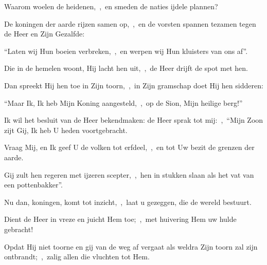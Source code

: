\documentclass[12pt,twoside,a5paper]{article}
\begin{document}
\begin{halfparskip}
  Waarom woelen de heidenen,~\sep\ en smeden de naties ijdele plannen?


  De koningen der aarde rijzen samen op,~\sep\ en de vorsten spannen tezamen tegen de Heer en Zijn Gezalfde:

  ``Laten wij Hun boeien verbreken,~\sep\ en werpen wij Hun kluisters van ons af''.
\end{halfparskip}


\begin{halfparskip}
  Die in de hemelen woont, Hij lacht hen uit,~\sep\ de Heer drijft de spot met hen.

  Dan spreekt Hij hen toe in Zijn toorn,~\sep\ in Zijn gramschap doet Hij hen sidderen:

  ``Maar Ik, Ik heb Mijn Koning aangesteld,~\sep\ op de Sion, Mijn heilige berg!''
\end{halfparskip}


\begin{halfparskip}
  Ik wil het besluit van de Heer bekendmaken: de Heer sprak tot mij:~\sep\ ``Mijn Zoon zijt Gij, Ik heb U heden voortgebracht.

  Vraag Mij, en Ik geef U de volken tot erfdeel,~\sep\ en tot Uw bezit de grenzen der aarde.

  Gij zult hen regeren met ijzeren scepter,~\sep\ hen in stukken slaan als het vat van een pottenbakker''.
\end{halfparskip}


\begin{halfparskip}
  Nu dan, koningen, komt tot inzicht,~\sep\ laat u gezeggen, die de wereld bestuurt.

  Dient de Heer in vreze en juicht Hem toe;~\sep\ met huivering Hem uw hulde gebracht!

  Opdat Hij niet toorne en gij van de weg af vergaat als weldra Zijn toorn zal zijn ontbrandt;~\sep\ zalig allen die vluchten tot Hem.
\end{halfparskip}


\end{document}
